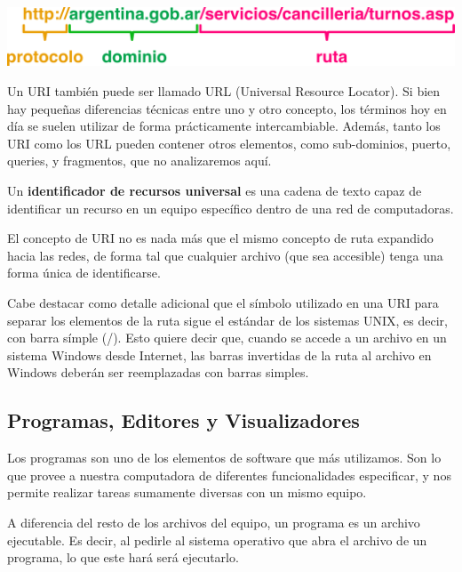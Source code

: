 \vspace{0.5cm}
\centerline{\includegraphics[]{unidades/2_informacion/2_informatica/imagenes/uris.png}}

Un URI también puede ser llamado URL (Universal Resource Locator). Si bien hay
pequeñas diferencias técnicas entre uno y otro concepto, los términos hoy en día
se suelen utilizar de forma prácticamente intercambiable. Además, tanto los URI
como los URL pueden contener otros elementos, como sub-dominios, puerto,
queries, y fragmentos, que no analizaremos aquí.

\begin{definition} Un
    \textbf{identificador de recursos universal} es una cadena de texto capaz de
    identificar un recurso en un equipo específico dentro de una red de
    computadoras.
\end{definition}

El concepto de URI no es nada más que el mismo concepto de ruta expandido hacia
las redes, de forma tal que cualquier archivo (que sea accesible) tenga una
forma única de identificarse.

Cabe destacar como detalle adicional que el símbolo utilizado en una URI para
separar los elementos de la ruta sigue el estándar de los sistemas UNIX, es
decir, con barra símple (/). Esto quiere decir que, cuando se accede a un
archivo en un sistema Windows desde Internet, las barras invertidas de la ruta
al archivo en Windows deberán ser reemplazadas con barras simples.

\subsection{Programas, Editores y Visualizadores}
\label{chap:informatica:subsec:programas}

Los programas son uno de los elementos de software que más utilizamos. Son lo
que provee a nuestra computadora de diferentes funcionalidades especificar, y
nos permite realizar tareas sumamente diversas con un mismo equipo.

A diferencia del resto de los archivos del equipo, un programa es un archivo
ejecutable. Es decir, al pedirle al sistema operativo que abra el archivo de un
programa, lo que este hará será ejecutarlo.

